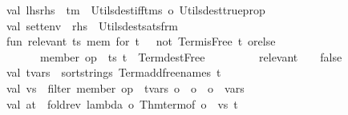 \begin{isabellebody}
\ \ \ \ val\ {\isacharparenleft}{\kern0pt}lhs{\isacharcomma}{\kern0pt}rhs{\isacharparenright}{\kern0pt}\ {\isacharequal}{\kern0pt}\ tm\ {\isacharbar}{\kern0pt}{\isachargreater}{\kern0pt}\ Utils{\isachardot}{\kern0pt}dest{\isacharunderscore}{\kern0pt}iff{\isacharunderscore}{\kern0pt}tms\ o\ Utils{\isachardot}{\kern0pt}dest{\isacharunderscore}{\kern0pt}trueprop\isanewline
\ \ \ \ val\ {\isacharparenleft}{\kern0pt}{\isacharparenleft}{\kern0pt}set{\isacharcomma}{\kern0pt}t{\isacharparenright}{\kern0pt}{\isacharcomma}{\kern0pt}env{\isacharparenright}{\kern0pt}\ {\isacharequal}{\kern0pt}\ rhs\ {\isacharbar}{\kern0pt}{\isachargreater}{\kern0pt}\ Utils{\isachardot}{\kern0pt}dest{\isacharunderscore}{\kern0pt}sats{\isacharunderscore}{\kern0pt}frm\isanewline
\ \ \ \ fun\ relevant\ ts\ \isactrlConstUNDERSCORE {\isasymopen}mem\ for\ t\ {\isacharunderscore}{\kern0pt}{\isasymclose}\ {\isacharequal}{\kern0pt}\ not\ {\isacharparenleft}{\kern0pt}Term{\isachardot}{\kern0pt}is{\isacharunderscore}{\kern0pt}Free\ t{\isacharparenright}{\kern0pt}\ orelse\isanewline
\ \ \ \ \ \ \ \ \ \ member\ {\isacharparenleft}{\kern0pt}op\ {\isacharequal}{\kern0pt}{\isacharparenright}{\kern0pt}\ ts\ {\isacharparenleft}{\kern0pt}t\ {\isacharbar}{\kern0pt}{\isachargreater}{\kern0pt}\ Term{\isachardot}{\kern0pt}dest{\isacharunderscore}{\kern0pt}Free\ {\isacharbar}{\kern0pt}{\isachargreater}{\kern0pt}\ {\isacharhash}{\kern0pt}{}{\isacharparenright}{\kern0pt}\isanewline
\ \ \ \ \ \ {\isacharbar}{\kern0pt}\ relevant\ {\isacharunderscore}{\kern0pt}\ {\isacharunderscore}{\kern0pt}\ {\isacharequal}{\kern0pt}\ false\isanewline
\ \ \ \ val\ t{\isacharunderscore}{\kern0pt}vars\ {\isacharequal}{\kern0pt}\ sort{\isacharunderscore}{\kern0pt}strings\ {\isacharparenleft}{\kern0pt}Term{\isachardot}{\kern0pt}add{\isacharunderscore}{\kern0pt}free{\isacharunderscore}{\kern0pt}names\ t\ {\isacharbrackleft}{\kern0pt}{\isacharbrackright}{\kern0pt}{\isacharparenright}{\kern0pt}\isanewline
\ \ \ \ val\ vs\ {\isacharequal}{\kern0pt}\ filter\ {\isacharparenleft}{\kern0pt}member\ {\isacharparenleft}{\kern0pt}op\ {\isacharequal}{\kern0pt}{\isacharparenright}{\kern0pt}\ t{\isacharunderscore}{\kern0pt}vars\ o\ {\isacharhash}{\kern0pt}{}\ o\ {\isacharhash}{\kern0pt}{}\ o\ {\isacharhash}{\kern0pt}{}{\isacharparenright}{\kern0pt}\ vars\isanewline
\ \ \ \ val\ at\ {\isacharequal}{\kern0pt}\ fold{\isacharunderscore}{\kern0pt}rev\ {\isacharparenleft}{\kern0pt}lambda\ o\ Thm{\isachardot}{\kern0pt}term{\isacharunderscore}{\kern0pt}of\ o\ {\isacharhash}{\kern0pt}{}{\isacharparenright}{\kern0pt}\ vs\ t\isanewline

\end{isabellebody}
